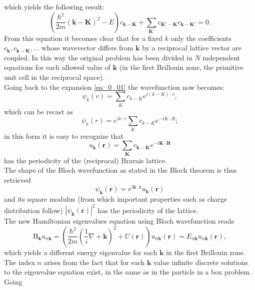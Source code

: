 which yields the following result:
\begin{equation}
    \left(\frac{\hbar^2}{2m}(\mathbf{k}-\mathbf{K})^2-E\right)c_{\mathbf{k}-\mathbf{K}}+\sum_{\mathbf{K}'}c_{\mathbf{K}'-\mathbf{K}}c_{\mathbf{k}-\mathbf{K}'}=0.
\end{equation}
From this equation it becomes clear that for a fixed $k$ only the coefficients $c_\mathbf{k},c_{\mathbf{k}-\mathbf{K}},...$ whose wavevector differs from 
$\mathbf{k}$ by a reciprocal lattice vector are coupled. In this way the original problem has been divided in $N$ independent equations for 
each allowed value of $\mathbf{k}$ (in the first Brillouin zone, the primitive unit cell in the reciprocal space).\\
Going back to the expansion \ref{eq_0_01} the wavefunction now becomes:
\begin{equation}
    \psi_k(r)=\sum_{K}c_{k-K}e^{i(k-K)\cdot r},
\end{equation}
which can be recast as 
\begin{equation}
    \psi_k(r)=e^{ik\cdot r}\sum_{K}c_{k-K}e^{-iK\cdot R};
\end{equation}
in this form it is easy to recognize that 
\begin{equation}
    u_\mathbf{k}(\mathbf{r})=\sum_\mathbf{K}c_{\mathbf{k}-\mathbf{K}}e^{-i\mathbf{K}\cdot\mathbf{R}}
\end{equation}
has the periodicity of the (reciprocal) Bravais lattice.\\
The shape of the Bloch wavefunction as stated in the Bloch theorem is thus retrieved
\begin{equation}
    \psi_\mathbf{k}(\mathbf{r})=e^{i\mathbf{k}\cdot \mathbf{r}}u_\mathbf{k}(\mathbf{r})
\end{equation}
and its square modulus (from which important properties such as charge distribution follow) $|\psi_\mathbf{k}(\mathbf{r})|^2$ has the periodicity of the
lattice.\\
The new Hamiltonian eigenvalues equation using Bloch wavefunction reads
\begin{equation}
    \mathrm{H}_\mathbf{k} u_{n\mathbf{k}}=\left(\frac{\hbar^2}{2m}\left(\frac{1}{i}\nabla+\mathbf{k}\right)^2+U(\mathbf{r})\right)u_{n\mathbf{k}}(\mathbf{r})=E_{n\mathbf{k}}u_{n\mathbf{k}}(\mathbf{r}),
\end{equation}
which yields a different energy eigenvalue for each $\mathbf{k}$ in the first Brillouin zone. The index $n$ arises from the fact that for 
each $\mathbf{k}$ value infinite discrete solutions to the eigenvalue equation exist, in the same as in the particle in a box problem. Going 
